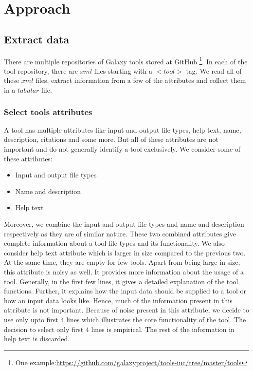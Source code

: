 \chapter{Approach}\label{chap:approach}
\section{Extract data}    
There are multiple repositories of Galaxy tools stored at GitHub \footnote{One example:\url{https://github.com/galaxyproject/tools-iuc/tree/master/tools}}. In each of the tool repository, there are $xml$ files starting with a $<tool>$ tag. We read all of these $xml$ files, extract information from a few of the attributes and collect them in a $tabular$ file.
    
\subsection{Select tools attributes}
A tool has multiple attributes like input and output file types, help text, name, description, citations and some more. But all of these attributes are not important and do not generally identify a tool exclusively. We consider some of these attributes:
\begin{itemize}
	\item Input and output file types
	\item Name and description
	\item Help text
\end{itemize}
Moreover, we combine the input and output file types and name and description respectively as they are of similar nature. These two combined attributes give complete information about a tool file types and its functionality. We also consider help text attribute which is larger in size compared to the previous two. At the same time, they are empty for few tools. Apart from being large in size, this attribute is noisy as well. It provides more information about the usage of a tool. Generally, in the first few lines, it gives a detailed explanation of the tool functions. Further, it explains how the input data should be supplied to a tool or how an input data looks like. Hence, much of the information present in this attribute is not important. Because of noise present in this attribute, we decide to use only upto first $4$ lines which illustrates the core functionality of the tool. The decision to select only first $4$ lines is empirical. The rest of the information in help text is discarded. 

